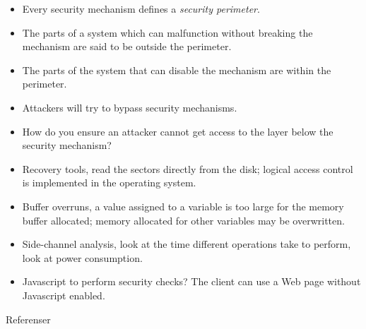 \documentclass{beamer}
\begin{document}
\begin{frame}{\insertsubsectionhead}
  \begin{itemize}
    \item Every security mechanism defines a \emph{security perimeter}.

    \item The parts of a system which can malfunction without breaking the 
      mechanism are said to be outside the perimeter.

    \item The parts of the system that can disable the mechanism are within the 
      perimeter.
  \end{itemize}
\end{frame}

\begin{frame}{\insertsubsectionhead}
  \begin{itemize}
    \item Attackers will try to bypass security mechanisms.

    \item How do you ensure an attacker cannot get access to the layer below 
      the security mechanism?
  \end{itemize}
\end{frame}

\begin{frame}{\insertsubsectionhead}
  \begin{itemize}
    \item Recovery tools, read the sectors directly from the disk; logical 
      access control is implemented in the operating system.

    \item Buffer overruns, a value assigned to a variable is too large for the 
      memory buffer allocated; memory allocated for other variables may be 
      overwritten.

    \item Side-channel analysis, look at the time different operations take to 
      perform, look at power consumption.

    \item Javascript to perform security checks?
      The client can use a Web page without Javascript enabled.

  \end{itemize}
\end{frame}



\begin{frame}[allowframebreaks]{Referenser}
	\small
  \printbibliography{}
\end{frame}
\end{document}
